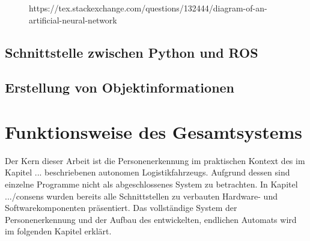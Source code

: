 \begin{figure}[H]
		
		\caption{https://tex.stackexchange.com/questions/132444/diagram-of-an-artificial-neural-network}
		\end{figure}
		\subsection{Schnittstelle zwischen Python und ROS}
		
		\subsection{Erstellung von Objektinformationen}
		\label{subsec: Erstellung von Objektinformationen}
	
	\section{Funktionsweise des Gesamtsystems}
	Der Kern dieser Arbeit ist die Personenerkennung im praktischen Kontext des im Kapitel ... beschriebenen autonomen Logistikfahrzeugs. Aufgrund dessen sind einzelne Programme nicht als abgeschlossenes System zu betrachten. In Kapitel .../consens wurden bereits alle Schnittstellen zu verbauten Hardware- und Softwarekomponenten präsentiert. Das vollständige System der Personenerkennung und der Aufbau des entwickelten, endlichen Automats wird im folgenden Kapitel erklärt.\\
	
